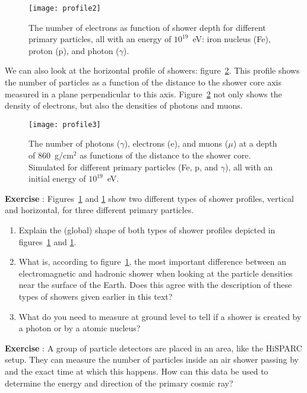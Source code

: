 \begin{figure}\begin{center}
\texttt{[image: profile2]}%
\caption{The number of electrons as function of shower depth for different primary particles, all with an energy of $10^{19}$~eV: iron nucleus (Fe), proton (p), and photon ($\gamma$).}\label{fig:profile2}
\end{center}\end{figure}

We can also look at the horizontal profile of showers: figure~\ref{fig:profile3}. This profile shows the number of particles as a function of the distance to the shower core axis measured in a plane perpendicular to this axis. Figure~\ref{fig:profile3} not only shows the density of electrons, but also the densities of photons and muons. 

\begin{figure}\begin{center}
\texttt{[image: profile3]}%
\caption{The number of photons ($\gamma$), electrons (e), and muons ($\mu$) at a depth of 860~g/cm$^2$ as functions of the distance to the shower core. Simulated for different primary particles (Fe, p, and $\gamma$), all with an initial energy of $10^{19}$~eV. }\label{fig:profile3}
\end{center}\end{figure}

\begin{shaded}
\textbf{Exercise \theExercise {}} : Figures~\ref{fig:profile2} and \ref{fig:profile2} show two different types of shower profiles, vertical and horizontal, for three different primary particles.
\begin{enumerate}[-]
\item Explain the (global) shape of both types of shower profiles depicted in figures~\ref{fig:profile2} and \ref{fig:profile2}.
\item What is, according to figure~\ref{fig:profile2}, the most important difference between an electromagnetic and hadronic shower when looking at the particle densities near the surface of the Earth. Does this agree with the description of these types of showers given earlier in this text?
\item What do you need to measure at ground level to tell if a shower is created by a photon or by a atomic nucleus?
\end{enumerate}\end{shaded}

\begin{shaded}
\textbf{Exercise \theExercise {}} : A group of particle detectors are placed in an area, like the HiSPARC setup. They can measure the number of particles inside an air shower passing by and the exact time at which this happens. How can this data be used to determine the energy and direction of the primary cosmic ray?\end{shaded}

